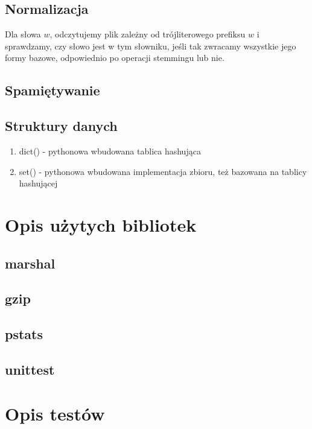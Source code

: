 \documentclass[11pt]{article}
\begin{document}
\subsection{Normalizacja}
Dla słowa $w$, odczytujemy plik zależny od trójliterowego prefiksu $w$ i sprawdzamy, czy słowo jest w tym słowniku,
jeśli tak zwracamy wszystkie jego formy bazowe, odpowiednio po operacji stemmingu lub nie.
\subsection{Spamiętywanie}
\subsection{Struktury danych}
\begin{enumerate}
\item dict() - pythonowa wbudowana tablica hashująca
\item set() - pythonowa wbudowana implementacja zbioru, też bazowana na tablicy hashującej
\end{enumerate}
\section{Opis użytych bibliotek}
\subsection{marshal}
\subsection{gzip}
\subsection{pstats}
\subsection{unittest}
\section{Opis testów}
\end{document}

